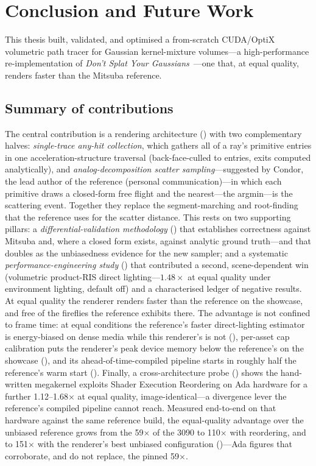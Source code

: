 \chapter{Conclusion and Future Work}
\label{ch:conclusion}

This thesis built, validated, and optimised a from-scratch CUDA/OptiX volumetric path tracer for
Gaussian kernel-mixture volumes---a high-performance re-implementation of \emph{Don't Splat Your
Gaussians}~\cite{DSYG}---one that, at equal quality, renders faster than the Mitsuba reference.

\section{Summary of contributions}
\label{sec:contributions}

The central contribution is a rendering architecture () with two
complementary halves: \emph{single-trace any-hit collection}, which gathers all of a ray's primitive
entries in one acceleration-structure traversal (back-face-culled to entries, exits computed
analytically), and \emph{analog-decomposition scatter sampling}---suggested by Condor, the lead author
of the reference (personal communication)---in which each primitive draws a
closed-form free flight and the nearest---the argmin---is the scattering event. Together they replace
the segment-marching and root-finding that the reference uses for the scatter
distance. This rests on two supporting pillars: a \emph{differential-validation methodology}
() that establishes correctness against Mitsuba and, where a closed form exists,
against analytic ground truth---and that doubles as the unbiasedness evidence for the new sampler; and a
systematic \emph{performance-engineering study} () that contributed a second,
scene-dependent win (volumetric product-RIS direct lighting---$1.48\times$ at equal quality under
environment lighting, default off) and a characterised ledger of negative results. At equal
quality the renderer renders faster than the reference on the showcase, and free of the fireflies the
reference exhibits there. The advantage is not confined to frame time: at equal
conditions the reference's faster direct-lighting estimator is energy-biased on dense media while this
renderer's is not (), per-asset cap calibration puts the renderer's peak
device memory below the reference's on the showcase (), and its
ahead-of-time-compiled pipeline starts in roughly half the reference's warm start
(). Finally, a cross-architecture probe () shows the
hand-written megakernel exploits Shader Execution Reordering on Ada hardware for a further
\num{1.12}--\num{1.68}$\times$ at equal quality, image-identical---a divergence lever the reference's
compiled pipeline cannot reach. Measured end-to-end on that hardware against the same reference build, the
equal-quality advantage over the unbiased reference grows from the \num{59}$\times$ of the \num{3090} to
\num{110}$\times$ with reordering, and to \num{151}$\times$ with the renderer's best unbiased
configuration ()---Ada figures that corroborate, and do not replace, the pinned
\num{59}$\times$.


